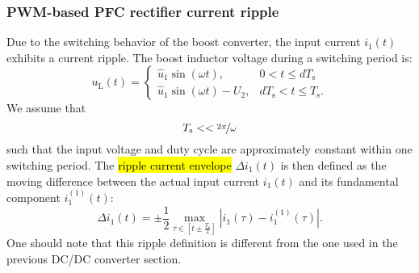 \begin{frame}
    \frametitle{PWM-based PFC rectifier current ripple} 
    Due to the switching behavior of the boost converter, the input current $i_1(t)$ exhibits a current ripple. The boost inductor voltage during a switching period is:
    \begin{equation}
        u_\mathrm{L}(t) = \begin{cases} \hat{u}_1 \sin(\omega t), & 0 < t \leq d T_\mathrm{s}\\
        \hat{u}_1 \sin(\omega t) - U_2, & d T_\mathrm{s} < t \leq T_\mathrm{s}. 
        \end{cases}
    \end{equation} 
    We assume that $$ T_\mathrm{s} << \nicefrac{2\pi}{\omega}$$ such that the input voltage and duty cycle are approximately constant within one switching period. The \hl{ripple  current envelope} $\Delta i_1(t)$ is then defined as the moving difference between the actual input current $i_1(t)$ and its fundamental component $i^{(1)}_1(t)$: 
    \begin{equation}
            \Delta i_1(t) = \pm \frac{1}{2} \max_{\tau\in[t \pm \frac{T_\mathrm{s}}{2}]}|i_1(\tau) - i^{(1)}_1(\tau)|.
    \end{equation}
    One should note that this ripple definition is different from the one used in the previous DC/DC converter section.
\end{frame}

